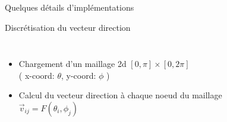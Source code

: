 \begin{frame}{Quelques détails d'implémentations}

\begin{block}{Discrétisation du vecteur direction}
  \begin{columns}

  \begin{itemize}
  \item Chargement d'un maillage 2d $\left[0,\pi\right] \times \left[0,2\pi\right]$  \\ ( x-coord: $\theta$, y-coord: $\phi$ )
  \item Calcul du vecteur direction à chaque noeud du maillage $\vec{v}_{ij} = F(\theta_{i},\phi_{j})$
  \end{itemize}


  \vspace*{-0.35\textwidth}
\begin{figure}[htb]
  \centering
\end{figure}
  \end{columns}


\end{block}
\end{frame}
